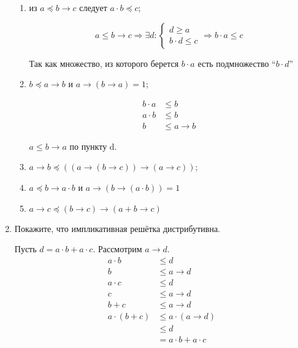 \begin{enumerate}
\begin{enumerate}
                  \item из $a \preceq b \rightarrow c$ следует $a \cdot b \preceq c$;

                        \[a \leq b \to c \Rightarrow \exists d : \begin{cases}
                                    d \geq a \\
                                    b\cdot d \leq c
                              \end{cases} \Rightarrow b\cdot a \leq c\]

                        Так как множество, из которого берется \(b\cdot a\) есть подмножество ``\(b\cdot d\)''

                  \item $b \preceq a \rightarrow b$ и $a \rightarrow (b \rightarrow a) = 1$;

                        \begin{align*}
                              b\cdot a & \leq b       \\
                              a\cdot b & \leq b       \\
                              b        & \leq a \to b
                        \end{align*}

                        \(a \leq b \to a\) по пункту d.

                  \item $a \rightarrow b \preceq ((a \rightarrow (b \rightarrow c)) \rightarrow (a \rightarrow c))$;
                  \item $a \preceq b \rightarrow a \cdot b$ и $a \rightarrow (b \rightarrow (a \cdot b)) = 1$
                  \item $a \rightarrow c \preceq (b \rightarrow c) \rightarrow (a + b \rightarrow c)$
            \end{enumerate}

      \item Покажите, что импликативная решётка дистрибутивна.

            Пусть \(d = a \cdot b + a \cdot c\). Рассмотрим \(a \to d\).
            \begin{align}
                  a \cdot b      & \leq d \label{по построению}            \\
                  b              & \leq a \to d \label{по определению to}  \\
                  a \cdot c      & \leq d \label{по построению2}           \\
                  c              & \leq a \to d \label{по определению to2} \\
                  b + c          & \leq a \to d \label{из предыдущих}      \\
                  a\cdot (b + c) & \leq a \cdot (a \to d)                  \\
                                 & \leq d                                  \\
                                 & = a\cdot b + a\cdot c
            \end{align}


\end{enumerate}
